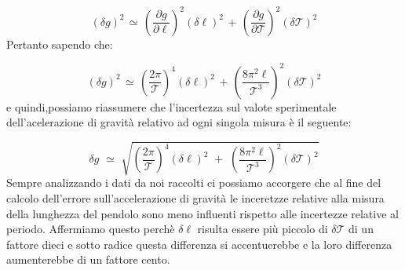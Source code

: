 \begin{equation*}
(\delta g)^2 \, \simeq \, \left( \frac{\partial g}{\partial \ell} \right)^2 (\delta \ell)^2 \, + \, \left( \frac{\partial g}{\partial \mathcal{T}} \right)^2 (\delta \mathcal{T})^2
\end{equation*}
%
Pertanto sapendo che:

\begin{equation*}
(\delta g)^2 \, \simeq \, \left( \frac{2 \pi}{\mathcal{T}} \right)^4 (\delta \ell)^2 \, + \, \left( \frac{8 \pi^2 \ell}{\mathcal{T}^3} \right)^2 (\delta \mathcal{T})^2
\end{equation*}
%
e quindi,possiamo riassumere che l'incertezza sul valote sperimentale dell'acelerazione di gravità relativo ad ogni singola misura è il seguente:

\begin{equation} \label{eq:delta_g}
\delta g \,\, \simeq \,\, \sqrt{\left( \frac{2 \pi}{\mathcal{T}} \right)^4 (\delta \ell)^2 \,\, + \,\, \left( \frac{8 \pi^2 \ell}{\mathcal{T}^3} \right)^2 (\delta \mathcal{T})^2}
\end{equation}
%
Sempre analizzando i dati da noi raccolti ci possiamo accorgere che al fine del calcolo dell'errore sull'accelerazione di gravità le inceretzze relative alla misura della lunghezza del pendolo sono meno influenti rispetto alle incertezze relative al periodo. Affermiamo questo perchè $\delta \ell$ risulta essere più piccolo di $\delta \mathcal{T}$ di un fattore dieci e sotto radice questa differenza si accentuerebbe e la loro differenza aumenterebbe di un fattore cento.


